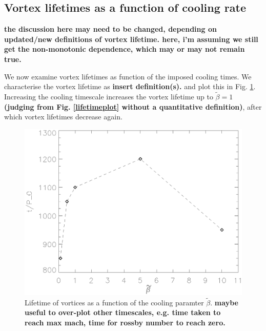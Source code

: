 
\subsection{Vortex lifetimes as a function of cooling
  rate}\label{lifetime_discuss} 
{\bf the discussion here may need to be changed, depending on
  updated/new definitions of vortex lifetime. here, i'm assuming we
  still get the non-monotonic dependence, which may or may not remain
  true. 
}

We now examine vortex lifetimes as function of the imposed cooling
times. We characterise the vortex lifetime as {\bf insert
  definition(s).} and plot this in Fig. \ref{betaplot}. 
Increasing the cooling timescale increases the vortex
lifetime up to $\tilde{\beta}=1$ {\bf (judging from
  Fig. \ref{lifetimeplot} without a quantitative definition)}, after
which vortex lifetimes decrease again. 


\begin{figure}
  \includegraphics[width=\linewidth]{figures/betaplot}
  \caption{Lifetime of vortices as a function of the cooling paramter 
    $\tilde\beta$. {\bf maybe useful to over-plot other timescales,
      e.g. time taken to reach max mach, time for rossby number to
      reach zero.}\label{betaplot}} 
\end{figure}

